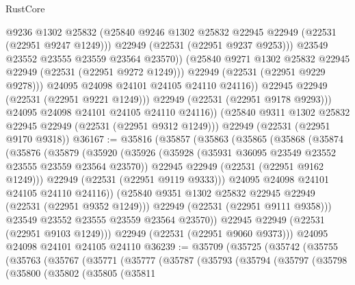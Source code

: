 \begin{lexlean}{RustCore}
\begin{coremodule}
                        @9236
                        @1302
                        @25832
                        (@25840 @9246 @1302 @25832 @22945 @22949 (@22531 (@22951 @9247 @1249)))
                        @22949
                        (@22531 (@22951 @9237 @9253)))
                      @23549
                      @23552
                      @23555
                      @23559
                      @23564
                      @23570))
                  (@25840 @9271 @1302 @25832 @22945 @22949 (@22531 (@22951 @9272 @1249)))
                  @22949
                  (@22531 (@22951 @9229 @9278)))
                @24095
                @24098
                @24101
                @24105
                @24110
                @24116))
            @22945
            @22949
            (@22531 (@22951 @9221 @1249)))
          @22949
          (@22531 (@22951 @9178 @9293)))
        @24095
        @24098
        @24101
        @24105
        @24110
        @24116))
    (@25840 @9311 @1302 @25832 @22945 @22949 (@22531 (@22951 @9312 @1249)))
    @22949
    (@22531 (@22951 @9170 @9318))
@36167 := @35816
    (@35857
      (@35863
        (@35865
          (@35868
            (@35874
              (@35876
                (@35879
                  (@35920
                    (@35926
                      (@35928 (@35931 @36095 @23549 @23552 @23555 @23559 @23564 @23570))
                      @22945
                      @22949
                      (@22531 (@22951 @9162 @1249)))
                    @22949
                    (@22531 (@22951 @9119 @9333)))
                  @24095
                  @24098
                  @24101
                  @24105
                  @24110
                  @24116))
              (@25840 @9351 @1302 @25832 @22945 @22949 (@22531 (@22951 @9352 @1249)))
              @22949
              (@22531 (@22951 @9111 @9358)))
            @23549
            @23552
            @23555
            @23559
            @23564
            @23570))
        @22945
        @22949
        (@22531 (@22951 @9103 @1249)))
      @22949
      (@22531 (@22951 @9060 @9373)))
    @24095
    @24098
    @24101
    @24105
    @24110
@36239 := @35709
    (@35725
      (@35742
        (@35755
          (@35763
            (@35767
              (@35771
                (@35777
                  (@35787
                    (@35793
                      (@35794
                        (@35797
                          (@35798
                            (@35800
                              (@35802
                                (@35805
                                  (@35811

\end{coremodule}
\end{lexlean}
